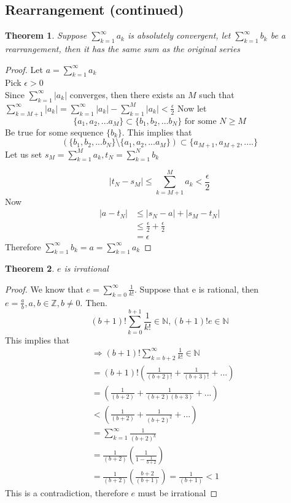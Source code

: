 \documentclass[12pt]{article}
\theoremstyle{plain}
\newtheorem{theorem}{Theorem}[section]
\theoremstyle{definition}
\begin{document}
\subsection{Rearrangement (continued)}

\begin{theorem}
	Suppose $\sum^\infty_{k=1} a_k$ is absolutely convergent, let $\sum^\infty_{k=1} b_k$ be a rearrangement, then it has the same sum as the original series
\end{theorem}

\begin{proof}
	Let $a = \sum^\infty_{k=1} a_k$\\
	Pick $\epsilon > 0$\\
	Since $\sum^\infty_{k=1} |a_k|$ converges, then there exists an $M$ such that $\sum^\infty_{k=M+1} |a_k| = \sum^\infty_{k=1} |a_k| - \sum^M_{k=1} |a_k| < \frac{\epsilon}{2}$
	Now let
	$$\{ a_1, a_2, ... a_M \} \subset \{ b_1, b_2, ... b_N \} \text{ for some } N \geq M $$
	Be true for some sequence $\{b_k \}$. This implies that
	$$(\{ b_1, b_2, ... b_N \} \setminus \{ a_1, a_2, ... a_M \})  \subset \{ a_{M+1}, a_{M+2}, .... \}$$
	Let us set $s_M = \sum^M_{k=1} a_k, t_N =  \sum^N_{k=1} b_k$
	
	$$|t_N - s_M| \leq  \sum^M_{k=M+1} a_k < \frac{\epsilon}{2}$$
	Now
	\begin{align*}
		|a - t_N| &\leq |s_N - a| + |s_M - t_N|\\
		&\leq  \frac{\epsilon}{2} +  \frac{\epsilon}{2}\\
		&= \epsilon
	\end{align*}
	Therefore $\sum^\infty_{k=1} b_k = a = \sum^\infty_{k=1} a_k$
\end{proof}

\begin{theorem}
	$e$ is irrational
\end{theorem}

\begin{proof}
	We know that $e = \sum^\infty_{k=0} \frac{1}{k!}$. Suppose that e is rational, then $e = \frac{a}{b}, a,b\in\mathbb{Z}, b \neq 0$. Then.
	$$(b+1)! \sum^{b+1}_{k=0} \frac{1}{k!} \in \mathbb{N}, (b+1)!e \in \mathbb{N}$$
	This implies that
	\begin{align*}
	&\Longrightarrow (b+1)! \sum^\infty_{k=b+2} \frac{1}{k!} \in \mathbb{N}\\
	&= (b+1)! (\frac{1}{(b+2)!} + \frac{1}{(b+3)!} + ...)\\
	&= (\frac{1}{(b+2)} + \frac{1}{(b+2)(b+3)} + ...)\\
	&<  (\frac{1}{(b+2)} + \frac{1}{(b+2)^2} + ...)\\
	&=  \sum^\infty_{k=1} \frac{1}{(b+2)^k}\\
	&= \frac{1}{(b+2)}(\frac{1}{1 - \frac{1}{b+2}})\\
	&= \frac{1}{(b+2)}(\frac{b+2}{(b+1)}) = \frac{1}{(b+1)} < 1
	\end{align*}
	This is a contradiction, therefore $e$ must be irrational

\end{proof}
\end{document}
